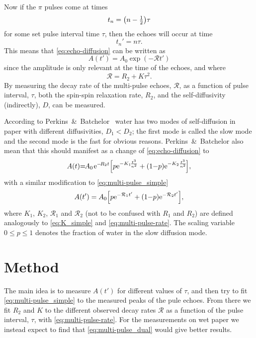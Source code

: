 \documentclass[11pt,a4paper, twocolumn,
swedish, english %
]{article}
\begin{document}
Now if the $\pi$ pulses come at times
\begin{equation}\label{eq:pulse-times}
t_{n}=\qty(n-\tfrac{1}{2})\tau
\end{equation}
for some set pulse interval time $\tau$, then the echoes will occur at
time  
\begin{equation}
t_n'=n\tau.
\end{equation}
This means that \eqref{eq:echo-diffusion} can be written as
\begin{equation}\label{eq:multi-pulse_simple}
A(t')=A_0\exp(-\mathcal{R}t')
\end{equation}
since the amplitude is only relevant at the time of the echoes, and
where 
\begin{equation}\label{eq:multi-pulse-rate}
\mathcal{R}=R_2+K\tau^2.
\end{equation}
By measuring the decay rate of the multi-pulse echoes, $\mathcal{R}$,
as a function of pulse interval, $\tau$, both the spin-spin relaxation
rate, $R_2$, and the self-diffusivity (indirectly), $D$, can be measured.

According to Perkins~\&~Batchelor~\cite{Perkins-Batchelor2012} water
has two modes of self-diffusion in paper with different diffusivities,
$D_1<D_2$; the first mode is called the slow mode and the second mode
is the fast for obvious reasons. Perkins~\&~Batchelor also mean that
this should manifest as a change of 
\eqref{eq:echo-diffusion} to
\begin{equation}
\begin{aligned}
A(t){=}\hspace{-1pt}A_0\hspace{1pt}
\mathrm{e}^{{-}\!R_2t}\qty[
p\mathrm{e}^{{-}K_1\!\frac{t^3}{n^2}} + (1{-}p)\mathrm{e}^{{-}K_2\frac{t^3}{n^2}}
\!],
\end{aligned}
\end{equation}
with a similar modification to \eqref{eq:multi-pulse_simple}
\begin{equation}\label{eq:multi-pulse_dual}
A(t')=A_0\qty[p\mathrm{e}^{-\mathcal{R}_1t'}+
(1{-}p)\mathrm{e}^{-\mathcal{R}_2t'}],
\end{equation}
where $K_1$, $K_2$, $\mathcal{R}_1$ and $\mathcal{R}_2$ (not to be
confused with $R_1$ and $R_2$) are defined analogously to
\eqref{eq:K_simple} and \eqref{eq:multi-pulse-rate}. The
scaling variable $0\le p\le1$ denotes the fraction of water in the
slow diffusion mode. 



\section{Method} \label{sec:met}
The main idea is to measure $A(t')$ for different values of $\tau$,
and then try to fit \eqref{eq:multi-pulse_simple} to the measured
peaks of the pule echoes. From there we fit $R_2$ and $K$ to the
different observed decay rates $\mathcal{R}$ as a function of the
pulse interval, $\tau$, with \eqref{eq:multi-pulse-rate}. For the
measurements on wet paper we instead expect to find that
\eqref{eq:multi-pulse_dual} would give better results.
\end{document}

